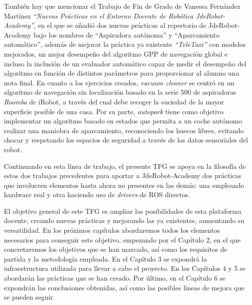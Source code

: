 También hay que mencionar el Trabajo de Fin de Grado de Vanessa Fernández Martínez \textit{“Nuevas Prácticas en el Entorno Docente de Robótica JdeRobot-Academy”}\cite{tfg2}, en el que se añadió dos nuevas prácticas al repertorio de JdeRobot-Academy bajo los nombres de “Aspiradora autónoma” y “Aparcamiento automático”, además de mejorar la práctica ya existente \textit{“TeleTaxi”} con modelos mejorados, un mejor desempeño del algoritmo GPP de navegación global e incluso la inclusión de un evaluador automático capaz de medir el desempeño del algoritmo en función de distintos parámetros para proporcionar al alumno una nota final. En cuanto a los ejercicios creados, \textit{vacuum cleaner} se centró en un algoritmo de navegación sin localización basado en la serie 500 de aspiradoras \textit{Roomba} de iRobot, a través del cual debe recoger la suciedad de la mayor superficie posible de una casa. Por su parte, \textit{autopark} tiene como objetivo implementar un algoritmo basado en estados que permita a un coche autónomo realizar una maniobra de aparcamiento, reconociendo los huecos libres, evitando chocar y respetando los espacios de seguridad a través de los datos sensoriales del robot.

Continuando en esta línea de trabajo, el presente TFG se apoya en la filosofía de estos dos trabajos precedentes para aportar a JdeRobot-Academy dos prácticas que involucren elementos hasta ahora no presentes en las demás: una empleando hardware real y otra haciendo uso de \textit{drivers} de ROS directos.

\vspace{3cm}

El objetivo general de este TFG es ampliar las posibilidades de esta plataforma docente, creando nuevas prácticas y mejorando las ya existentes, aumentando su versatilidad. En los próximos capítulos abordaremos todos los elementos necesarios para conseguir este objetivo, empezando por el Capítulo 2, en el que concretaremos los objetivos que se han marcado, así como los requisitos de partida y la metodología empleada. En el Capítulo 3 se expondrá la infraestructura utilizada para llevar a cabo el proyecto. En los Capítulos 4 y 5 se abordarán las prácticas que se han creado. Por último, en el Capítulo 6 se expondrán las conclusiones obtenidas, así como las posibles líneas de mejora que se pueden seguir.